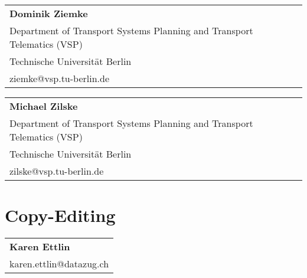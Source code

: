 \begin{tabular}[width=0.48\textwidth]{@{}l}
\textbf{Dominik Ziemke} \\
Department of Transport Systems Planning and Transport Telematics (VSP) \\
Technische Universität Berlin \\
ziemke@vsp.tu-berlin.de \\
\end{tabular}

\begin{tabular}[width=0.48\textwidth]{@{}l}
\textbf{Michael Zilske} \\
Department of Transport Systems Planning and Transport Telematics (VSP) \\
Technische Universität Berlin \\
zilske@vsp.tu-berlin.de \\
\end{tabular}

\section*{Copy-Editing}

\begin{tabular}[width=0.48\textwidth]{@{}l}
\textbf{Karen Ettlin} \\
karen.ettlin@datazug.ch \\
\end{tabular}



